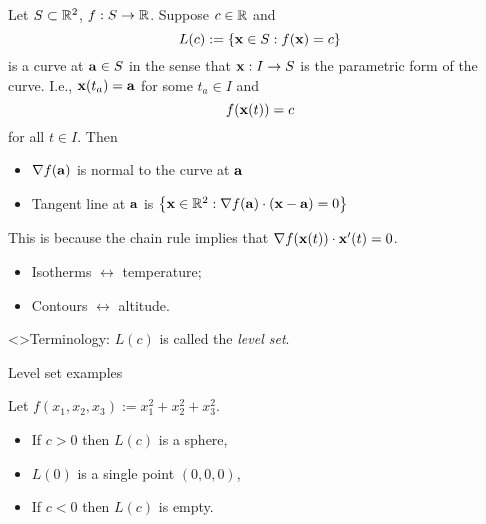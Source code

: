 Let \(S\subset \bR^2\), \(f:S\to\bR\).
Suppose \(c\in \bR\) and
\[
    L(c) := \left\{\xx\in S : f(\xx)=c\right\}
\]
is a curve at \(\aa \in S\) in the sense that  \(\xx:I \to S\) is the parametric form of the curve.
I.e., \(\xx(t_a) = \aa\) for some \(t_a \in I\) and \[f(\xx(t))=c\] for all \(t\in I\).
Then
\begin{itemize}
    \item \(\nabla f(\aa)\) is normal to the curve at \(\aa\)
    \item Tangent line at \(\aa\) is
          \(\left\{\xx\in\bR^2: \nabla f(\aa) \cdot (\xx-\aa)=0\right\}\)
\end{itemize}

This is because the chain rule implies that \(\nabla f(\xx(t)) \cdot \xx'(t) = 0\).






\begin{itemize}
    \item   Isotherms \(\leftrightarrow\) temperature;
    \item   Contours \(\leftrightarrow\)  altitude.
\end{itemize}

<>{Terminology:}
\(L(c)\) is called the \emph{level set}.









{Level set examples}





\begin{example*}
    Let \(f(x_1,x_2,x_3):=x_1^2 + x_2^2 + x_3^2\).
    \begin{itemize}
        \item If \(c>0\) then \(L(c)\) %
              is a sphere,
        \item \(L(0) \) is a single point \((0,0,0)\),
        \item If \(c<0\) then \(L(c)\) is empty.
    \end{itemize}
\end{example*}


